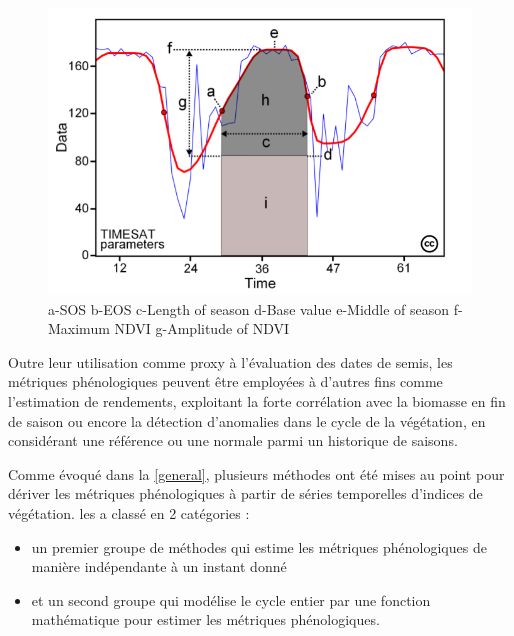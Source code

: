 \begin{figure}[tb]
 \begin{center}
  \includegraphics[scale=0.45]{synthese_biblio/metrics.png} 
 \end{center}
 \caption{a-SOS b-EOS c-Length of season d-Base value e-Middle of season f-Maximum NDVI g-Amplitude of NDVI \citep{Eklundh2017}}
 \label{metrics}
\end{figure}
\vspace{5mm}

Outre leur utilisation comme proxy à l'évaluation des dates de semis, les métriques phénologiques peuvent être employées à d'autres fins comme l'estimation de rendements, exploitant 
la forte corrélation avec la biomasse en fin de saison ou encore la détection d'anomalies dans le cycle de la végétation, en considérant une référence ou une normale parmi un 
historique de saisons.

\vspace{5mm}

Comme évoqué dans la \cref{general}, plusieurs méthodes ont été mises au point pour dériver les métriques phénologiques à partir de séries temporelles d'indices de végétation.
\citep{Atzberger2013} les a classé en 2 catégories : 
\begin{itemize}
 \item un premier groupe de méthodes qui estime les métriques phénologiques de manière indépendante à un instant donné 
 \item et un second groupe qui modélise le cycle entier par une fonction mathématique pour estimer les métriques phénologiques.
\end{itemize}

